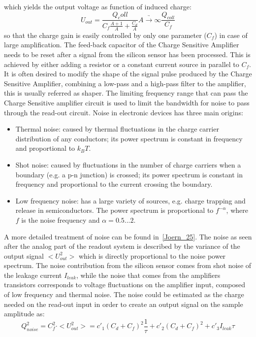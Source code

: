 which yields the output voltage as function of induced charge:
\begin{equation}
U_{out} = \frac{Q_coll}{C_f\frac{A+1}{A}+\frac{C_d}{A}}\underrightarrow{A\rightarrow\infty}\frac{Q_{coll}}{C_f}
\end{equation}
so that the charge gain is easily controlled by only one parameter ($C_f$) in case of large amplification.
The feed-back capacitor of the Charge Sensitive Amplifier needs to be reset after a signal from the silicon sensor has been processed. This is achieved by either adding a resistor or a constant current source in parallel to $C_f$.
It is often desired to modify the shape of the signal pulse produced by the Charge Sensitive Amplifier, combining a low-pass and a high-pass filter to the amplifier, this is usually referred as shaper. The limiting frequency range that can pass the Charge Sensitive amplifier circuit is used to limit the bandwidth for noise to pass through the read-out circuit. Noise in electronic devices has three main origins:
\begin{itemize}
\item Thermal noise: caused by thermal fluctuations in the charge carrier distribution of any conductors; its power spectrum is constant in frequency and proportional to $k_BT$.
\item Shot noise: caused by fluctuations in the number of charge carriers when a boundary (e.g. a p-n junction) is crossed; its power spectrum is constant in frequency and proportional to the current crossing the boundary.
\item Low frequency noise: has a large variety of sources, e.g. charge trapping and release in semiconductors. The power spectrum is proportional to $f^{-\alpha}$, where $f$ is the noise frequency and $\alpha = 0.5 ... 2$.
\end{itemize}
A more detailed treatment of noise can be found in~\ref{Joern_25}.
The noise as seen after the analog part of the readout system is described by the variance of the output signal $<U_{out}^2>$ which is directly proportional to the noise power spectrum.
The noise contribution from the silicon sensor comes from shot noise of the leakage current $I_{leak}$, while the noise that comes from the amplifiers transistors corresponds to voltage fluctuations on the amplifier input, composed of low frequency and thermal noise.
The noise could be estimated as the charge needed on the read-out input in order to create an output signal on the sample amplitude as:
\begin{equation}
Q^2_{noise}=C^2_f \cdot <U^2_{out}> = c'_1(C_d +C_f)^2 \frac{1}{\tau} + c'_2 (C_d+C_f)^2 + c'_3I_{leak}\tau
\end{equation}
